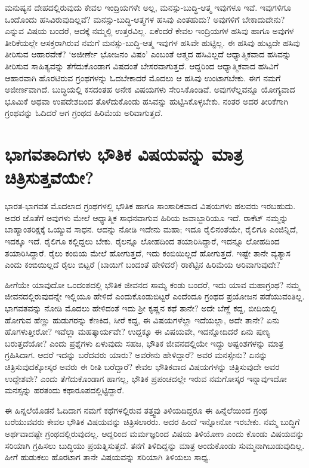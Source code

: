 ಮನುಷ್ಯನ ದೇಹದಲ್ಲಿರುವುದು ಕೇವಲ ಇಂದ್ರಿಯಗಳೇ ಅಲ್ಲ, ಮನಸ್ಸು-ಬುದ್ಧಿ-ಆತ್ಮ ಇವುಗಳೂ ಇವೆ. ಇವುಗಳಿಗೂ ಒಂದೊಂದು ಹಸಿವಿರುವುದಿಲ್ಲವೆ? ಮನಸ್ಸು-ಬುದ್ಧಿ-ಆತ್ಮಗಳ ಹಸಿವು ಎಂತಹುದು? ಅವುಗಳಿಗೆ ಬೇಕಾದುದೇನು? ಎನ್ನುವ ವಿಷಯ ಬಂದರೆ, ಆದಕ್ಕೆ  ನಮ್ಮಲ್ಲಿ ಉತ್ತರವಿಲ್ಲ. ಏಕೆಂದರೆ ಕೇವಲ ಇಂದ್ರಿಯಗಳ ಹಸಿವು ಹಾಗೂ ಅವುಗಳ ತೀರಿಕೆಯಲ್ಲೇ ಆಸಕ್ತರಾಗಿರುವ ನಮಗೆ ಮನಸ್ಸು-ಬುದ್ಧಿ-ಆತ್ಮ ಇವುಗಳ ಹಸಿವೇ ಹುಟ್ಟಿಲ್ಲ. ಈ ಹಸಿವು ಹುಟ್ಟದೇ ಹಸಿವು ತೀರಿಸುವ ಆಹಾರವೇಕೆ? `ಅಜೀರ್ಣೇ ಭೋಜನಂ ವಿಷಂ' ಎಂಬಂತೆ ಆತ್ಮದ ಹಸಿವಿಲ್ಲದೆ ಆಧ್ಯಾತ್ಮಿಕವಾದ ಹಸಿವನ್ನು ತೀರಿಸುವ ಸಾಹಿತ್ಯವನ್ನು ತೆಗೆದುಕೊಂಡಾಗ ವಿಷದಂತೆ ಬೇಸರವಾಗುತ್ತದೆ. ಆದ್ದರಿಂದ ಆಧ್ಯಾತ್ಮಿಕವಾದ ಹಸಿವಿಗೆ ಆಹಾರವಾಗಿ ಹೊರಟಿರುವ ಗ್ರಂಥಗಳನ್ನು ಓದಬೇಕಾದರೆ ಮೊದಲು ಆ ಹಸಿವು ಉಂಟಾಗಬೇಕು. ಈಗ ನಮಗೆ ಅಜೀರ್ಣವಾಗಿದೆ. ಬುದ್ಧಿಯಲ್ಲಿ ಕಸದಂತಹ ಅನೇಕ ವಿಷಯಗಳು ಸೇರಿಸಿಕೊಂಡಿವೆ. ಅವುಗಳೆಲ್ಲವನ್ನೂ ಯೋಗ್ಯವಾದ ಭೂಮಿಕೆ ಅಥವಾ ಉಪದೇಶದಿಂದ ತೊಳೆದುಕೊಂಡು ಹಸಿವನ್ನು ಹುಟ್ಟಿಸಿಕೊಳ್ಳಬೇಕು. ನಂತರ ಅದರ ತೀರಿಕೆಗಾಗಿ ಗ್ರಂಥವನ್ನು ಓದಿದರೆ ಆಗ ಗ್ರಂಥದ ಹಿರಿಮೆಯ ಅರಿವಾಗುತ್ತದೆ.

\section*{ಭಾಗವತಾದಿಗಳು ಭೌತಿಕ ವಿಷಯವನ್ನು ಮಾತ್ರ ಚಿತ್ರಿಸುತ್ತವೆಯೇ?}

ಭಾರತ-ಭಾಗವತ ಮೊದಲಾದ ಗ್ರಂಥಗಳಲ್ಲಿ ಭೌತಿಕ ಹಾಗೂ ಸಾಂಸಾರಿಕವಾದ ವಿಷಯಗಳು ಹಲವರು ಇರಬಹುದು. ಅದರ ಜೊತೆಗೆ ಅವುಗಳು ಮೇಲೆ ಆಧ್ಯಾತ್ಮಿಕ ಸಾಧನವಾಗುವ ಹಿರಿಯ ಜವಾಬ್ದಾರಿಯೂ ಇದೆ. ರಾಕೆಟ್ ನಮ್ಮನ್ನು ಬಾಹ್ಯಾಂತರಿಕ್ಷಕ್ಕೆ ಒಯ್ಯುವ ಸಾಧನ. ಆದನ್ನು ನೋಡಿ ಇದೇನು ಮಹಾ; ಇದೂ ರೈಲಿನಂತೆಯೇ, ರೈಲಿಗೂ ಎಂಜಿನ್ನಿದೆ, ಇದಕ್ಕೂ ಇದೆ. ರೈಲಿಗೂ ಕಲ್ಲಿದ್ದಲು ಬೇಕು. ರೈಲನ್ನೂ ಲೋಹದಿಂದ ತಯಾರಿಸಿದ್ದಾರೆ, ಇದನ್ನೂ ಲೋಹದಿಂದ ತಯಾರಿಸಿದ್ದಾರೆ. ರೈಲು ಕಂಬಿಯ ಮೇಲೆ ಹೋಗುತ್ತದೆ, ಇದು ಕಂಬಿಯಿಲ್ಲದೆ ಹೋಗುತ್ತದೆ. ಇಷ್ಟೇ ತಾನೇ ವ್ಯತ್ಯಾಸ ಎಂದು ಕಂಬಿಯಿಲ್ಲದೆ ರೈಲು ಬಿಟ್ಟರೆ (ಬಾಯಿಗೆ ಬಂದಂತೆ ಹೇಳಿದರೆ) ರಾಕೆಟ್ಟಿನ ಹಿರಿಮೆಯ ಅರಿವಾಗುವುದೇ?

ಹೀಗೆಯೇ ಯಾವುದೋ ಒಂದಂಶದಲ್ಲಿ ಭೌತಿಕ ಜೀವನದ ಸಾಮ್ಯ ಕಂಡು ಬಂದರೆ, ಇದು ಯಾವ ಮಹಾಗ್ರಂಥ? ನಮ್ಮ ಜೀವನದಲ್ಲಿರುವುದನ್ನೇ ಇಲ್ಲಿಯೂ ಹೇಳಿದೆ ಎಂದುಕೊಂಡುಬಿಟ್ಟರೆ  ಎಂದೆಂದೂ ಗ್ರಂಥದ ಪ್ರಯೋಜನ ಪಡೆಯುವಂತಿಲ್ಲ. ಭಾಗವತವನ್ನು ನೋಡಿ ಮೊದಲು ಹೇಳಿದಂತೆ ಇದು ಶ್ರೀ ಕೃಷ್ಣನ ಕಥೆ ತಾನೇ? ಅದೇ ಬೆಣ್ಣೆ ಕದ್ದ, ಬೀದಿಯಲ್ಲಿ ಹೋಗುವ ಹೆಣ್ಣು ಹುಡುಗರನ್ನು ಕೆಣಕಿದ, ಸೀರೆ ಕದ್ದ, ಈ ವಿಷಯಗಳೆಲ್ಲಾ ಇದೆಯಲ್ಲಾ, ಅದೇ ತಾನೇ? ಏನು ಹೊಗಳುತ್ತೀರೋ? ಇವೆಲ್ಲಾ ಮಹತ್ಕಾರ್ಯವೇ? ಉದ್ದಕ್ಕೂ ಈ ವಿಷಯವೇ, ಇದನ್ನೋದಿದರೆ ಏನು ಪುಣ್ಯ ಬರುತ್ತದೆಯೋ? ಎಂದು ಪ್ರಶ್ನೆಗಳು ಏಳುವುದು ಸಹಜ, ಭೌತಿಕ ಜೀವನದಲ್ಲಿಯೇ ಇದ್ದು ಅಷ್ಟಂಶಗಳನ್ನು ಮಾತ್ರ ಗ್ರಹಿಸಿದಾಗ. ಆದರೆ ಇದನ್ನು ಬರೆದವರು ಯಾರು? ಅವರೇನು ಹೇಳಿದ್ದಾರೆ? ಅವರ ಮನಸ್ಸೇನು? ಏನನ್ನು ಚಿತ್ರಿಸುವುದಕ್ಕೋಸ್ಕರ ಅವರು ಈ ರೀತಿ ಬರೆದ್ದಾರೆ? ಕೇವಲ ಭೌತಿಕವಾದ ವಿಷಯಗಳನ್ನು ಚಿತ್ರಿಸುವುದೇ ಅವರ ಉದ್ದೇಶವೇ? ಎಂದು ತೆಗೆದುಕೊಂಡಾಗ ಹಾಗಲ್ಲ, ಭೌತಿಕ ಪ್ರಪಂಚದಲ್ಲೇ ಇರುವ ನಮಗೋಸ್ಕರ ಇನ್ನಾವುಇದೋ ಮನಸ್ಸನ್ನು ಹರತಂದು ಕಥಾರೂಪದಲ್ಲಿಟ್ಟಿದ್ದಾರೆ.

ಈ ಹಿನ್ನಲೆಯೊಡನೆ ಓದಿದಾಗ ನಮಗೆ ಕಥೆಗಳಲ್ಲಿರುವ ತತ್ತ್ವವು ತಿಳಿಯದಿದ್ದರೂ ಈ ಹಿನ್ನೆಲೆಯಿಂದ ಗ್ರಂಥ ಬರೆಯುವವರು ಕೇವಲ ಭೌತಿಕ ವಿಷಯವನ್ನು ಚಿತ್ರಿಸಲಾರರು. ಅದರ ಹಿಂದೆ ಇನ್ನೋನೋ ಇರಬೇಕು. ನಮ್ಮ ಬುದ್ಧಿಗೆ ಅರ್ಥವಾದಷ್ಟೇ ಗ್ರಂಥದಲ್ಲಿರುವುದಲ್ಲ. ಆದ್ದರಿಂದ ಮರ್ಮಜ್ಞರಿಂದ ವಿಷಯ ತಿಳಿಯೋಣ ಎಂದು ಕೊಂಡು ವಿಷಯವನ್ನು ಸರಿಯಾಗಿ ಗ್ರಹಿಸಲು ಬುದ್ಧಿಯು ಪ್ರಯತ್ನಿಸುತ್ತದೆ. ತನಗೆ ತಿಳಿದಿದ್ದನ್ನು ಮಾತ್ರ ಅಂದುಕೊಂಡು ಸುಮ್ಮನಾಗಿಬುಡುವುದಿಲ್ಲ. ಹೀಗೆ ಹುಡುಕಲು ಹೊರಟಾಗ ತಾನೇ ವಿಷಯವನ್ನು ಸರಿಯಾಗಿ ತಿಳಿಯಲು ಸಾಧ್ಯ.

